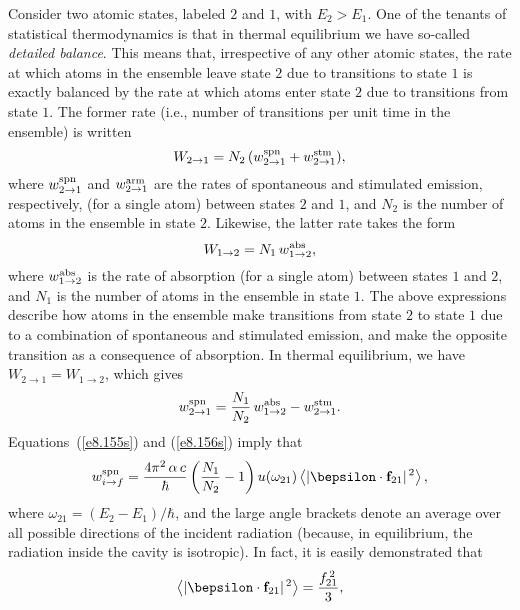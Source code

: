 Consider two atomic states, labeled $2$ and $1$, with $E_2> E_1$. One
of the tenants of statistical thermodynamics is that in thermal equilibrium
we have so-called {\em detailed balance}. This means that, irrespective
of any other atomic states, the rate at which atoms in the ensemble leave
state $2$ due to  transitions to state $1$ is exactly balanced by the
rate at which atoms enter state $2$ due to transitions from state $1$.
The former rate ({\rm i.e.}, number of transitions per unit time in the ensemble) is written
\begin{equation}
W_{2\rightarrow 1} = N_2\,(w_{2\rightarrow 1}^{\rm spn} + w_{2\rightarrow 1}^{\rm stm}),
\end{equation}
where $w_{2\rightarrow 1}^{\rm spn}$ and $w_{2\rightarrow 1}^{\rm arm}$ are the rates of spontaneous  and stimulated emission,
respectively, 
(for a single atom) between
states $2$ and $1$, and $N_2$ is the number of atoms in the ensemble
in state $2$. Likewise, the latter rate takes the form
\begin{equation}
W_{1\rightarrow 2} = N_1\,w^{\rm abs}_{1\rightarrow 2},
\end{equation}
where  $w^{\rm abs}_{1\rightarrow 2}$ is the rate of absorption (for a single atom) between states $1$ and $2$, and $N_1$ is the number of atoms in the ensemble in state $1$.
The above expressions describe how atoms in the ensemble make transitions from
state $2$ to state $1$ due to a combination of spontaneous and stimulated emission, and make the opposite transition as a consequence  of absorption.
In thermal equilibrium, we have $W_{2\rightarrow 1}=W_{1\rightarrow 2}$,
which gives
\begin{equation}
w_{2\rightarrow 1}^{\rm spn} = \frac{N_1}{N_2}\,w^{\rm abs}_{1\rightarrow 2}-
w_{2\rightarrow 1}^{\rm stm}.
\end{equation}
Equations~(\ref{e8.155s}) and (\ref{e8.156s}) imply that
\begin{equation}\label{e13.113}
w_{i\rightarrow f}^{\rm spn} =\frac{4\pi^2\,\alpha\,c}{\hbar} \left(\frac{N_1}{N_2}-1\right)u(\omega_{21})\left\langle |\bepsilon\cdot {\bf f}_{21}|^{\,2}\right\rangle,
\end{equation}
where $\omega_{21}= (E_2-E_1)/\hbar$, and the large angle brackets denote an average over all possible directions of the incident radiation (because, in equilibrium, the
radiation inside the cavity is isotropic). 
In fact, it is easily demonstrated that
\begin{equation}\label{e3.105c}
\left\langle |\bepsilon\cdot{\bf f}_{21}|^{\,2}\right\rangle = \frac{f_{21}^{\,2}}{3},
\end{equation}
